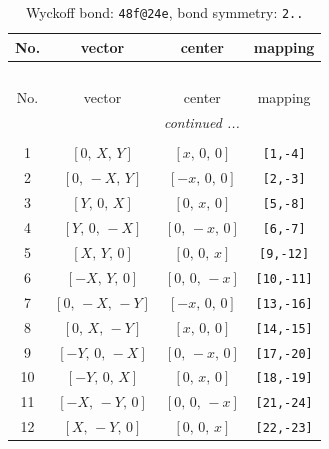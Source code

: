 \documentclass[fleqn,8pt]{jsarticle}
\begin{document}
\begin{longtable}{cccc}
\caption{Wyckoff bond: {\tt 48f@24e}, bond symmetry: {\tt 2..}}
 \\
 \hline \hline
No. & vector & center & mapping \\ \hline \endfirsthead

\multicolumn{3}{l}{\tablename\ \thetable{}} \\
 \hline \hline
No. & vector & center & mapping \\ \hline \endhead

 \hline \hline
\multicolumn{3}{r}{\footnotesize\it continued ...} \\ \endfoot

 \hline \hline
\multicolumn{3}{r}{} \\ \endlastfoot

1 & $\left[ 0,\, X,\, Y \right]$ & $\left[ x,\, 0,\, 0 \right]$ & {\tt [1,-4]} \\ \hline
2 & $\left[ 0,\, - X,\, Y \right]$ & $\left[ - x,\, 0,\, 0 \right]$ & {\tt [2,-3]} \\ \hline
3 & $\left[ Y,\, 0,\, X \right]$ & $\left[ 0,\, x,\, 0 \right]$ & {\tt [5,-8]} \\ \hline
4 & $\left[ Y,\, 0,\, - X \right]$ & $\left[ 0,\, - x,\, 0 \right]$ & {\tt [6,-7]} \\ \hline
5 & $\left[ X,\, Y,\, 0 \right]$ & $\left[ 0,\, 0,\, x \right]$ & {\tt [9,-12]} \\ \hline
6 & $\left[ - X,\, Y,\, 0 \right]$ & $\left[ 0,\, 0,\, - x \right]$ & {\tt [10,-11]} \\ \hline
7 & $\left[ 0,\, - X,\, - Y \right]$ & $\left[ - x,\, 0,\, 0 \right]$ & {\tt [13,-16]} \\ \hline
8 & $\left[ 0,\, X,\, - Y \right]$ & $\left[ x,\, 0,\, 0 \right]$ & {\tt [14,-15]} \\ \hline
9 & $\left[ - Y,\, 0,\, - X \right]$ & $\left[ 0,\, - x,\, 0 \right]$ & {\tt [17,-20]} \\ \hline
10 & $\left[ - Y,\, 0,\, X \right]$ & $\left[ 0,\, x,\, 0 \right]$ & {\tt [18,-19]} \\ \hline
11 & $\left[ - X,\, - Y,\, 0 \right]$ & $\left[ 0,\, 0,\, - x \right]$ & {\tt [21,-24]} \\ \hline
12 & $\left[ X,\, - Y,\, 0 \right]$ & $\left[ 0,\, 0,\, x \right]$ & {\tt [22,-23]} \\
\end{longtable}
\renewcommand{\arraystretch}{1.2}
\end{document}
